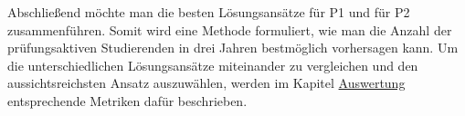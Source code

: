 Abschlie{\ss}end m\"ochte man die besten L\"osungsans\"atze f\"ur P1 und f\"ur P2 zusammenf\"uhren. Somit wird eine Methode formuliert, wie man
die Anzahl der pr\"ufungsaktiven Studierenden in drei Jahren bestm\"oglich vorhersagen kann. Um die unterschiedlichen L\"osungsans\"atze miteinander
zu vergleichen und den aussichtsreichsten Ansatz auszuw\"ahlen, werden im Kapitel \hyperref[sec:auswertung]{Auswertung} entsprechende Metriken daf\"ur beschrieben.